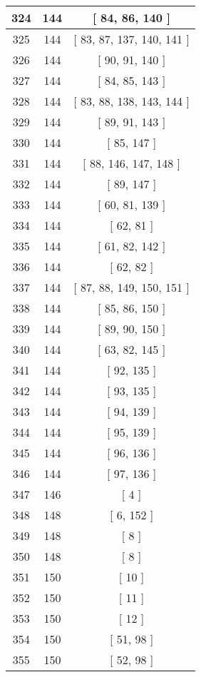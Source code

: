 \begin{center}
\begin{longtable}[H]{|| c c c ||}
\hline
324 & 144 & [ 84, 86, 140 ] \\ 
\hline
325 & 144 & [ 83, 87, 137, 140, 141 ] \\ 
\hline
326 & 144 & [ 90, 91, 140 ] \\ 
\hline
327 & 144 & [ 84, 85, 143 ] \\ 
\hline
328 & 144 & [ 83, 88, 138, 143, 144 ] \\ 
\hline
329 & 144 & [ 89, 91, 143 ] \\ 
\hline
330 & 144 & [ 85, 147 ] \\ 
\hline
331 & 144 & [ 88, 146, 147, 148 ] \\ 
\hline
332 & 144 & [ 89, 147 ] \\ 
\hline
333 & 144 & [ 60, 81, 139 ] \\ 
\hline
334 & 144 & [ 62, 81 ] \\ 
\hline
335 & 144 & [ 61, 82, 142 ] \\ 
\hline
336 & 144 & [ 62, 82 ] \\ 
\hline
337 & 144 & [ 87, 88, 149, 150, 151 ] \\ 
\hline
338 & 144 & [ 85, 86, 150 ] \\ 
\hline
339 & 144 & [ 89, 90, 150 ] \\ 
\hline
340 & 144 & [ 63, 82, 145 ] \\ 
\hline
341 & 144 & [ 92, 135 ] \\ 
\hline
342 & 144 & [ 93, 135 ] \\ 
\hline
343 & 144 & [ 94, 139 ] \\ 
\hline
344 & 144 & [ 95, 139 ] \\ 
\hline
345 & 144 & [ 96, 136 ] \\ 
\hline
346 & 144 & [ 97, 136 ] \\ 
\hline
347 & 146 & [ 4 ] \\ 
\hline
348 & 148 & [ 6, 152 ] \\ 
\hline
349 & 148 & [ 8 ] \\ 
\hline
350 & 148 & [ 8 ] \\ 
\hline
351 & 150 & [ 10 ] \\ 
\hline
352 & 150 & [ 11 ] \\ 
\hline
353 & 150 & [ 12 ] \\ 
\hline
354 & 150 & [ 51, 98 ] \\ 
\hline
355 & 150 & [ 52, 98 ] \\ 
\hline
\end{longtable}
\end{center}
